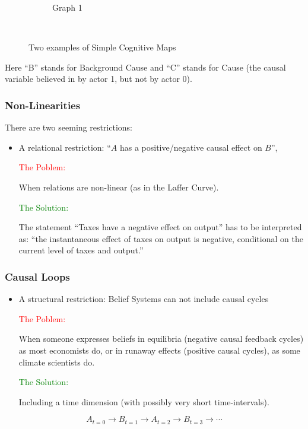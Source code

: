 \documentclass{beamer}
\begin{document}
\begin{frame}
\begin{figure}
\begin{subfigure}[b]{0.3\textwidth}
                \caption{Graph 1}
                \label{fig:tiger}
        \end{subfigure}
        ~ %
        \caption{Two examples of Simple Cognitive Maps}\label{fig:animals}
\end{figure}
Here ``B'' stands for Background Cause and ``C'' stands for Cause (the causal variable believed in by actor 1, but not by actor 0).
\end{frame}

\begin{frame}
\frametitle{Non-Linearities}
There are two seeming restrictions:
\begin{itemize}
\item A relational restriction: ``$A$ has a positive/negative causal effect on $B$'',\\
\begin{center}
\textcolor{red}{The Poblem:}\\
\end{center}
 When relations are non-linear (as in the Laffer Curve).
\begin{center}
\textcolor{green}{The Solution:}\\
\end{center}
The statement ``Taxes have a negative effect on output'' has to be interpreted as: ``the instantaneous effect of taxes on output is negative, conditional on the current level of taxes and output.''\\
\end{itemize}
\end{frame}
\begin{frame}
\frametitle{Causal Loops}
\begin{itemize}
\item A structural restriction: Belief Systems can not include causal cycles\\
\begin{center}
\textcolor{red}{The Poblem:}\\
\end{center}
When someone expresses beliefs in equilibria (negative causal feedback cycles) as most economists do, or in runaway effects (positive causal cycles), as some climate scientists do.
\begin{center}
\textcolor{green}{The Solution:}\\
\end{center}
Including a time dimension (with possibly very short time-intervals).
\end{itemize}
$$A_{t=0}\rightarrow B_{t=1} \rightarrow A_{t=2}\rightarrow B_{t=3}\rightarrow \cdots$$
\end{frame}
\end{document}
